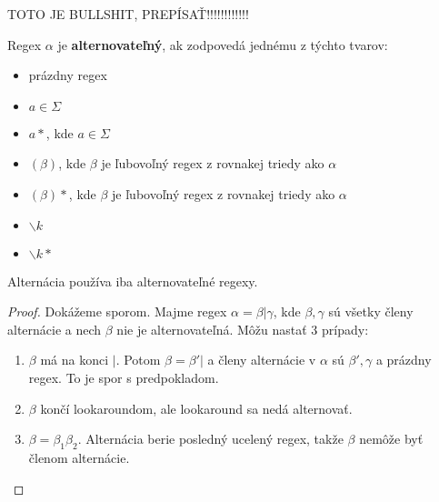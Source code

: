 \TODO TOTO JE BULLSHIT, PREPÍSAŤ!!!!!!!!!!!!
\begin{df}
Regex $\alpha$ je \textbf{alternovateľný}, ak zodpovedá jednému z týchto tvarov:
\begin{itemize}
\item prázdny regex
\item $a\in\Sigma$ 
\item $a*$, kde $a\in\Sigma$
\item $(\beta)$, kde $\beta$ je ľubovoľný regex z rovnakej triedy ako $\alpha$
\item $(\beta)*$, kde $\beta$ je ľubovoľný regex z rovnakej triedy ako $\alpha$
\item $\backslash k$
\item $\backslash k *$
\end{itemize}
\end{df}

\begin{lema}
Alternácia používa iba alternovateľné regexy.
\end{lema}
\begin{proof}
Dokážeme sporom. Majme regex $\alpha = \beta | \gamma$, kde $\beta,\gamma$ sú všetky členy alternácie a nech $\beta$ nie je alternovateľná. Môžu nastať 3 prípady:
\begin{enumerate}
\setlength{\itemsep}{0cm}%
\setlength{\parskip}{0cm}%
\item $\beta$ má na konci $|$. Potom $\beta = \beta'|$ a členy alternácie v $\alpha$ sú $\beta', \gamma$ a prázdny regex. To je spor s predpokladom.
\item $\beta$ končí lookaroundom, ale lookaround sa nedá alternovať.
\item $\beta = \beta_1\beta_2$. Alternácia berie posledný ucelený regex, takže $\beta$ nemôže byť členom alternácie.
\end{enumerate}
\end{proof}

